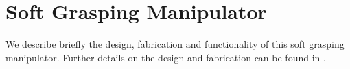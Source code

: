 \section{Soft Grasping Manipulator}
\label{sec:soft_grasping_manipulator}
We describe briefly the design, fabrication and functionality of this soft grasping manipulator. Further details on the design and fabrication can be found in \cite{marchese2015recipe}.

